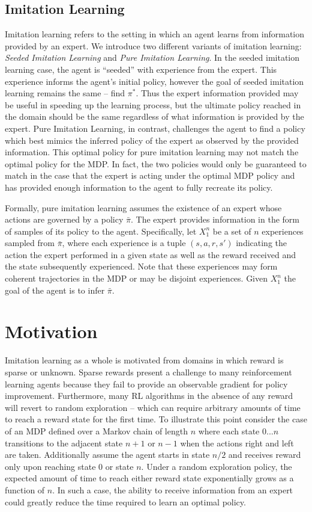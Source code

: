 \documentclass{article} %
\begin{document}
\subsection{Imitation Learning}
Imitation learning refers to the setting in which an agent learns from information provided by an expert. We introduce two different variants of imitation learning: \textit{Seeded Imitation Learning} and \textit{Pure Imitation Learning}. In the seeded imitation learning case, the agent is ``seeded'' with experience from the expert. This experience informs the agent's initial policy, however the goal of seeded imitation learning remains the same -- find $\pi^*$. Thus the expert information provided may be useful in speeding up the learning process, but the ultimate policy reached in the domain should be the same regardless of what information is provided by the expert. Pure Imitation Learning, in contrast, challenges the agent to find a policy which best mimics the inferred policy of the expert as observed by the provided information. This optimal policy for pure imitation learning may not match the optimal policy for the MDP. In fact, the two policies would only be guaranteed to match in the case that the expert is acting under the optimal MDP policy and has provided enough information to the agent to fully recreate its policy.

Formally, pure imitation learning assumes the existence of an expert whose actions are governed by a policy $\bar{\pi}$. The expert provides information in the form of samples of its policy to the agent. Specifically, let $X_1^n$ be a set of $n$ experiences sampled from $\bar\pi$, where each experience is a tuple $(s,a,r,s')$ indicating the action the expert performed in a given state as well as the reward received and the state subsequently experienced. Note that these experiences may form coherent trajectories in the MDP or may be disjoint experiences. Given $X_1^n$ the goal of the agent is to infer $\bar{\pi}$.

\section{Motivation}
Imitation learning as a whole is motivated from domains in which reward is sparse or unknown. Sparse rewards present a challenge to many reinforcement learning agents because they fail to provide an observable gradient for policy improvement. Furthermore, many RL algorithms in the absence of any reward will revert to random exploration -- which can require arbitrary amounts of time to reach a reward state for the first time. To illustrate this point consider the case of an MDP defined over a Markov chain of length $n$ where each state $0...n$ transitions to the adjacent state $n+1$ or $n-1$ when the actions right and left are taken. Additionally assume the agent starts in state $n/2$ and receives reward only upon reaching state $0$ or state $n$. Under a random exploration policy, the expected amount of time to reach either reward state exponentially grows as a function of $n$. In such a case, the ability to receive information from an expert could greatly reduce the time required to learn an optimal policy. 
\end{document}
